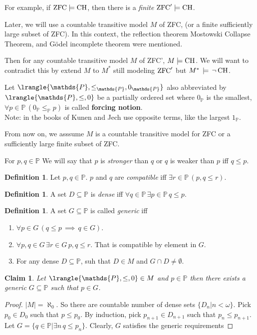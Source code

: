 \documentclass[11pt,pdftex,twoside,a4paper]{article}
\newcommand{\B}[1]{\textbf{#1}}
\newcommand{\CH}{\ensuremath{\mathop{\rm CH}\nolimits}}
\newcommand{\dsP}{\ensuremath{\mathds{P}}}
\newcommand{\ZFC}{\ensuremath{\mathop{\rm ZFC}\nolimits}}
\newtheorem{claim}[thm]{Claim}
\theoremstyle{definition}
\newtheorem{ldef}[thm]{Definition}
\begin{document}
For example, if \(\ZFC \models \CH\),
then there is a \emph{finite} \(\ZFC' \models \CH\).

Later, we will use a countable transitive model $M$ of ZFC,
(or a finite sufficiently large subset of ZFC).
In this context, the reflection theorem
Mostowski Collapse Theorem, and G\"odel incomplete theorem were mentioned.

Then for any countable transitive model $M$ of ZFC', \(M \models \CH\).
We will want to contradict this by extend $M$ to \(M^*\)
still modeling \(\ZFC'\) but \(M^*\, \models \,\neg\CH\).

Let
\(\lrangle{\dsP,\leq_\dsP,0_\dsP}\)
also abbreviated by
\(\lrangle{\dsP,\leq,0}\)
be a partially ordered set
where \(0_\dsP\) is the smallest, \(\forall p\in\dsP\,(0_\dsP \leq_\dsP p)\)
is called \B{forcing notion}.
\\
Note: in the books of Kunen and Jech use opposite terms,
like the largest  \(1_\dsP\).

From now on, we asssume $M$ is a countable transitive model for ZFC
or a sufficiently large finite subset of ZFC.

For \(p,q\in\dsP\) We will say that $p$ is \emph{stronger} than $q$
or $q$ is weaker than $p$ iff  \(q \leq p\).

\begin{ldef}
Let \(p,q\in\dsP\). $p$ and $q$ are \emph{compatible} iff
\(\exists r\in\dsP\,(p,q\leq r)\).
\end{ldef}

\begin{ldef}
A set \(D\subseteq \dsP\) is \emph{dense} iff
\(\forall q\in\dsP\,\exists p\in\dsP\, q\leq p\).
\end{ldef}

\begin{ldef}
A set \(G\subseteq\dsP\) is called \emph{generic} iff
\begin{enumerate}
\item \(\forall p\in G\,(q\leq p\,\implies\,q\in G)\).
\item \(\forall p,q\in G\,\exists r\in G\, p,q\leq r\).
  That is compatible by element in $G$.
\item For any dense \(D\subseteq \dsP\),
  suh that \(D\in M\) and \(G\cap D\neq \emptyset\).
\end{enumerate}
\end{ldef}

\begin{claim}
Let \(\lrangle{\dsP,\leq,0}\in M\) and \(p\in\dsP\)
then there exists a generic \(G\subseteq \dsP\) such that \(p\in G\).
\end{claim}
\begin{proof}
\(|M|=\aleph_0\). So there are countable number of dense sets
\(\{D_n|n<\omega\}\). Pick \(p_0\in D_0\) such that \(p \leq p_0\).
By induction, pick \(p_{n+1}\in D_{n+1}\) such that \(p_n \leq p_{n+1}\).
Let \(G=\{q\in\dsP|\exists n\, q \leq p_n\}\).
Clearly, $G$ satisfies the generic requirements
\end{proof}
\end{document}
